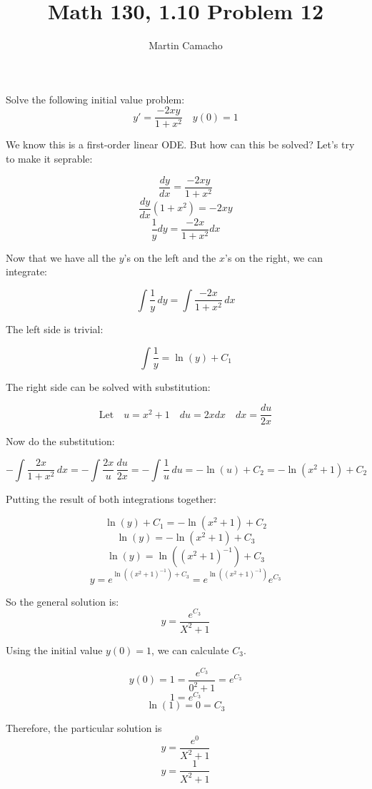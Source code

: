 \documentclass{article}
\begin{document}
\title{Math 130, 1.10 Problem 12}

\author{Martin Camacho}
\maketitle

Solve the following initial value problem:
\[ 
  y' = \frac{-2xy}{1 + x^2} \quad y(0) = 1 
\]

We know this is a first-order linear ODE. But how can this be solved? 
Let's try to make it seprable:

\[ \frac{dy}{dx} = \frac{-2xy}{1 + x^2} \]
\[ \frac{dy}{dx}(1 + x^2) = -2xy \]
\[ \frac{1}{y}dy = \frac{-2x}{1 + x^2}dx \]

Now that we have all the \(y\)'s on the left and the \(x\)'s on the right, we can integrate:

\[ \int \frac{1}{y} \,dy = \int \frac{-2x}{1 + x^2} \,dx \]

The left side is trivial:

\[ \int \frac{1}{y} = \ln(y) + C_1\]

The right side can be solved with substitution:

\[\textrm{Let} \quad u = x^2 + 1 \quad du = 2xdx \quad dx = \frac{du}{2x}\]

Now do the substitution:

\[-\int \frac{2x}{1 + x^2} \,dx = -\int \frac{2x}{u} \,\frac{du}{2x} = -\int \frac{1}{u} \,du = -\ln(u) + C_2 = -\ln(x^2 + 1) + C_2\]

Putting the result of both integrations together:

\[ \ln(y) + C_1 = -\ln(x^2 + 1) + C_2\]
\[ \ln(y) = -\ln(x^2 + 1) + C_3\]
\[ \ln(y) = \ln((x^2 + 1)^{-1}) + C_3\]
\[ y = e^{\ln((x^2 + 1)^{-1}) + C_3} = e^{\ln((x^2 + 1)^{-1})}e^{C_3}\]

So the general solution is:
\[ y = \frac{e^{C_3}}{X^2 + 1}\]

Using the initial value  \(y(0) = 1\), we can calculate  \(C_3\).

\[ y(0) = 1 = \frac{e^{C_3}}{0^2 + 1} = e^{C_3}\]
\[ 1 = e^{C_3}\]
\[ \ln(1) = 0 = C_3\]

Therefore, the particular solution is
\[ y = \frac{e^{0}}{X^2 + 1}\]
\[ y = \frac{1}{X^2 + 1}\]
\end{document}
